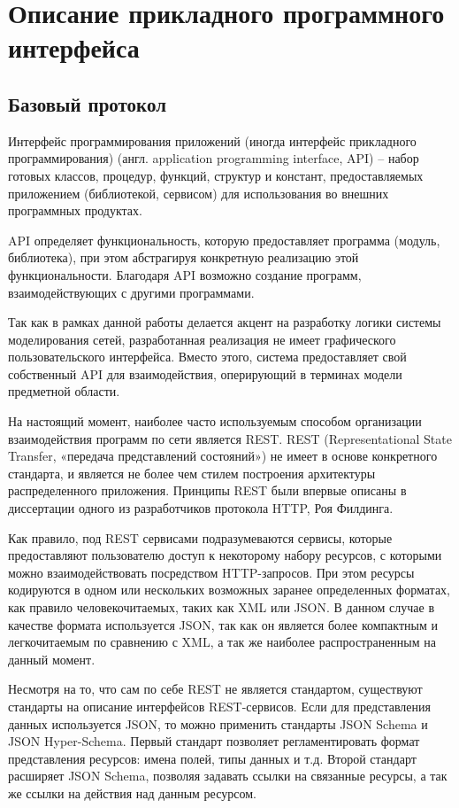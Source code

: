 \section{Описание прикладного программного интерфейса}
\subsection{Базовый протокол}

Интерфейс программирования приложений (иногда интерфейс прикладного программирования) (англ. application programming interface, API) --  набор готовых классов, процедур, функций, структур и констант, предоставляемых приложением (библиотекой, сервисом) для использования во внешних программных продуктах.

API определяет функциональность, которую предоставляет программа (модуль, библиотека), при этом абстрагируя конкретную реализацию этой функциональности. Благодаря API возможно создание
программ, взаимодействующих с другими программами.

Так как в рамках данной работы делается акцент на разработку логики системы моделирования сетей,
разработанная реализация не имеет графического пользовательского интерфейса. Вместо этого,
система предоставляет свой собственный API для взаимодействия, оперирующий в терминах 
модели предметной области.

На настоящий момент, наиболее часто используемым способом организации взаимодействия
программ по сети является REST. REST (Representational State Transfer, «передача представлений 
состояний») не имеет в основе конкретного стандарта, и является не более чем стилем построения 
архитектуры распределенного приложения. Принципы REST были впервые описаны в диссертации
одного из разработчиков протокола HTTP, Роя Филдинга.\cite{restapi}

Как правило, под REST сервисами подразумеваются сервисы, которые предоставляют пользователю
доступ к некоторому набору ресурсов, с которыми можно взаимодействовать посредством
HTTP-запросов. При этом ресурсы кодируются в одном или нескольких возможных заранее
определенных форматах, как правило человекочитаемых, таких как XML или JSON.
В данном случае в качестве формата используется JSON, так как он является более компактным
и легкочитаемым по сравнению с XML, а так же наиболее распространенным на данный момент.

Несмотря на то, что сам по себе REST не является стандартом, существуют стандарты на описание
интерфейсов REST-сервисов. Если для представления данных используется JSON, то можно
применить стандарты JSON Schema и JSON Hyper-Schema. Первый стандарт позволяет
регламентировать формат представления ресурсов: имена полей, типы данных и т.д. Второй
стандарт расширяет JSON Schema, позволяя задавать ссылки на связанные ресурсы, а так же
ссылки на действия над данным ресурсом.

